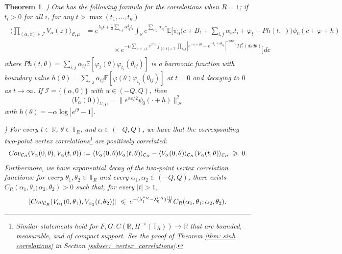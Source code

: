 \documentclass[10pt,a4paper]{amsart}
\newtheorem{theorem}{Theorem}
\newcommand{\R}{\mathbb{R}}
\def\T{\mathbb{T}}
\newcommand{\cjd}{\rangle}
\newcommand{\cjg}{\langle}
\renewcommand{\geq}{\;\geqslant\;}                   %
\renewcommand{\leq}{\;\leqslant\;}                   %
\newcommand{\mc}{\mathcal}
\begin{document}
\begin{theorem}
)
One has the following formula for the correlations when $R=1$; if $t_i >0$ for all $i$, for any $t>\max(t_1,\dots,t_n)$ 
\begin{align}
\begin{split}
 \Big\cjg \prod_{(\alpha,z)\in \mc{I}}V_{\alpha}(z)\Big\cjd_{\mc{C},\mu}   & =  e^{\lambda_0 t + \frac{1}{2}\sum_{i,j}\alpha_{ij}^2t_i} \int_\R e^{\sum_{i,j}\alpha_{ij} c}\mathbb{E}\big[\psi_0\big(c+B_t+\sum_{i,j} \alpha_{ij}t_i+ \varphi_t + Ph (t,\cdot))\psi_0(c+\varphi+h) 
\\
& \qquad \qquad \times e^{-\mu \sum_{\sigma = \pm 1} e^{\sigma\gamma c} \int_{[0,t]\times \T} \prod_{i,j} |e^{-s+i\theta}-e^{-t_i+i\theta_{ij}}|^{-\gamma \sigma \alpha_{ij}} M^\sigma_\gamma(dsd\theta)}\big ]dc
\end{split}
\end{align}
where $Ph(t,\theta) = \sum_{i,j} \alpha_{ij}\mathbb E[ \varphi_t(\theta) \varphi_{t_i}(\theta_{ij})]$ is a harmonic function with boundary value $h(\theta)= \sum_{i,j} \alpha_{ij}\mathbb E[ \varphi(\theta) \varphi_{t_i}(\theta_{ij})]$ at $t=0$ and decaying to $0$ as $t\to \infty$.
If $\mathcal{I}=\{(\alpha,0)\}$ with $\alpha\in (-Q,Q)$, then  \begin{equation} 
\label{vertex explicit}
\cjg V_{\alpha}(0)\cjd_{\mc{C},\mu} = \|e^{\alpha c/2} \psi_{0}(\cdot+h)\|^2_\mc{H}
\end{equation}
with $h(\theta)=-\alpha \log|e^{i\theta}-1|$.

\vspace{3mm}

) For every $t \in \mathbb R$, $\theta \in \mathbb T_R$, and $\alpha \in (-Q,Q)$, we have that the corresponding two-point vertex correlations\footnote{Similar statements hold for $F,G:C(\mathbb R, H^{-s}(\mathbb T_R))\to \R$ that are bounded, measurable, and of compact support. See the proof of Theorem \ref{thm: sinh correlations} in Section \ref{subsec:_vertex_correlations}.} are positively correlated:
\begin{equation}
{\rm Cov}_{\mathcal C_R}(V_\alpha(0,\theta), V_\alpha(t,\theta)):= \langle V_\alpha(0,\theta) V_\alpha(t,\theta) \rangle_{\mathcal C_R} - \langle V_\alpha(0,\theta) \rangle_{\mathcal C_R}\langle  V_\alpha(t,\theta) \rangle_{\mathcal C_R}\geq 0. 	
\end{equation}
Furthermore, we have exponential decay of the two-point vertex correlation functions: for every $\theta_1,\theta_2 \in \mathbb T_R$ and every $\alpha_1,\alpha_2 \in (-Q,Q)$, there exists $C_{R}(\alpha_1,\theta_1; \alpha_2,\theta_2)>0$ such that, for every $|t| > 1$,
\begin{equation}
|{\rm Cov}_{\mathcal C_R}(V_{\alpha_1}(0,\theta_1), V_{\alpha_2}(t,\theta_2))| \leq e^{-(\lambda_1^{\mu_R}-\lambda_0^{\mu_R})\frac{|t|}R} C_R(\alpha_1,\theta_1; \alpha_2,\theta_2).	
\end{equation}
\end{theorem}
\end{document}
